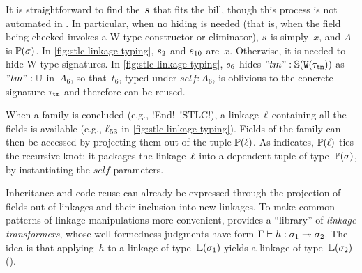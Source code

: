It is straightforward to find the~$s$ that fits the bill, though this process
is not automated in \TT.
In particular, when no hiding is needed (that is, when the field being checked
invokes a W-type constructor or eliminator), $s$ is simply~$x$,
and $A$ is $\mathbb{P}({\sigma})$.
In \cref{fig:stlc-linkage-typing}, $s_2$ and $s_{10}$ are~$x$.
Otherwise, it is needed to hide W-type signatures. In \cref{fig:stlc-linkage-typing},
$s_6$ hides $"tm" : \mathbb{S}({\texttt{W}({\tau_{\texttt{tm}}})})$
as $"tm" : \mathbb{U}$ in~$A_6$,
so that~$t_6$, typed under $\mathit{self}:A_6$, is oblivious to the concrete signature
$\tau_{\texttt{tm}}$ and therefore can be reused.



When a family is concluded (e.g., \lsti!End!~\lsti!STLC!),
a linkage~$\ell$ containing all the fields is available
(e.g., $\ell_{53}$ in \cref{fig:stlc-linkage-typing}).
Fields of the family can then be accessed by projecting them out of the tuple
$\mathbb{P}({\ell})$.
As  indicates, $\mathbb{P}({\ell})$ ties the recursive knot:
it packages the linkage~$\ell$ into a dependent tuple of type~$\mathbb{P}({\sigma})$,
by instantiating the $\mathit{self}$ parameters.



Inheritance and code reuse can already be expressed through the projection
of fields out of linkages and their inclusion into new linkages.
To make common patterns of linkage manipulations more convenient,
\TT provides a ``library'' of \emph{linkage transformers}, whose well-formedness judgments
have form $ {\Gamma} \vdash {h} : {\sigma_1} \twoheadrightarrow {\ensuremath{\sigma}_2}$. The idea is that
applying~$h$ to a linkage of type~$\mathbb{L}({\sigma_1})$ yields a linkage of
type~$\mathbb{L}({\sigma_2})$ ().


